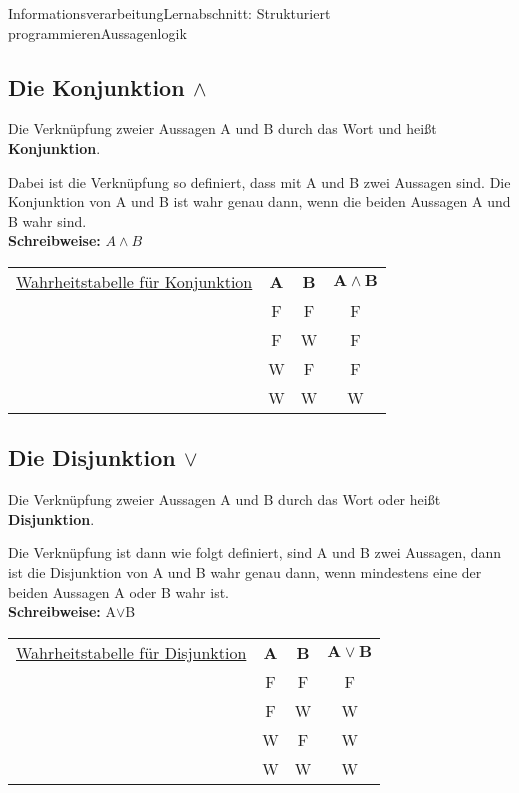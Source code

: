 \documentclass[11pt,oneside,openany,headings=optiontotoc,11pt,numbers=noenddot]{article}
\begin{document}
\begin{worksheet}{Informationsverarbeitung}{Lernabschnitt: Strukturiert programmieren}{Aussagenlogik}
		\subsection{Die Konjunktion \grqq{}$\wedge$\grqq{}}
		Die Verknüpfung zweier Aussagen A und B durch das Wort \grqq{}und\grqq{} heißt \textbf{Konjunktion}.
		\begin{framed}
			\noindent
			Dabei ist die Verknüpfung so definiert, dass mit A und B zwei Aussagen sind. Die Konjunktion von A und B ist wahr genau dann, wenn die beiden Aussagen A und B wahr sind.\\
			\textbf{Schreibweise:} \(A\wedge{}B\)
		\end{framed}
		\par\noindent
		\begin{tabularx}{\textwidth}{l|c|c|c|}
			\cline{2-4}
			\underline{Wahrheitstabelle für Konjunktion} & \textbf{A} & \textbf{B} & \(\mathbf{A\wedge{}B}\)\\
			\cline{2-4}
			& F & F & F\\
			\cline{2-4}
			& F & W & F\\
			\cline{2-4}
			& W & F & F\\
			\cline{2-4}
			& W & W & W\\
			\cline{2-4}
		\end{tabularx}
		\subsection{Die Disjunktion \grqq{}$\vee$\grqq{}}
		Die Verknüpfung zweier Aussagen A und B durch das Wort \grqq{}oder\grqq{} heißt \textbf{Disjunktion}.
		\begin{framed}
			\noindent
			Die Verknüpfung ist dann wie folgt definiert, sind A und B zwei Aussagen, dann ist die Disjunktion von A und B wahr genau dann, wenn mindestens eine der beiden Aussagen A oder B wahr ist.\\
			\textbf{Schreibweise:} A$\vee$B
		\end{framed}
		\par\noindent
		\begin{tabularx}{\textwidth}{l|c|c|c|}
			\cline{2-4}
			\underline{Wahrheitstabelle für Disjunktion} & \textbf{A} & \textbf{B} & \(\mathbf{A\vee{}B}\)\\
			\cline{2-4}
			& F & F & F\\
			\cline{2-4}
			& F & W & W\\
			\cline{2-4}
			& W & F & W\\
			\cline{2-4}
			& W & W & W\\
			\cline{2-4}
		\end{tabularx}

\end{worksheet}
\end{document}
